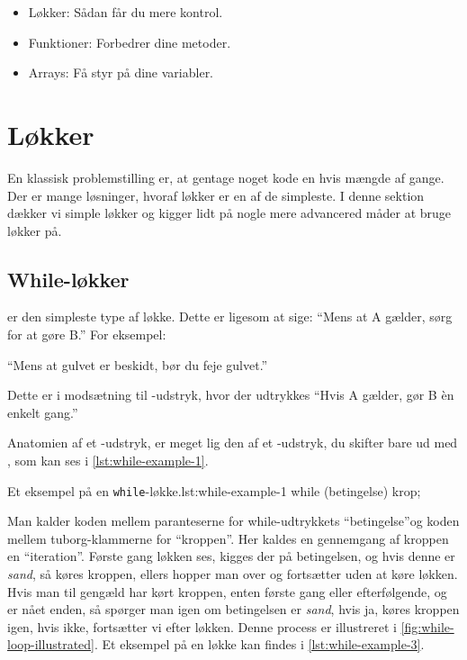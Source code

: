 	\begin{itemize} %
		\item Løkker: Sådan får du mere kontrol.
		\item Funktioner: Forbedrer dine metoder.
		\item Arrays: Få styr på dine variabler.
	\end{itemize}

\section{Løkker}

    En klassisk problemstilling er, at gentage noget kode en hvis
    mængde af gange. Der er mange løsninger, hvoraf løkker er en af
    de simpleste. I denne sektion dækker vi simple løkker og kigger
    lidt på nogle mere advancered måder at bruge løkker på.

	\subsection{While-løkker}

         er den simpleste type af løkke. Dette er ligesom at
		sige: ``Mens at A gælder, sørg for at gøre B.'' For eksempel:

		``Mens at gulvet er beskidt, bør du feje gulvet.''

		Dette er i modsætning til -udstryk, hvor der udtrykkes
		``Hvis A gælder, gør B èn enkelt gang.''

		Anatomien af et -udstryk, er meget lig den af et
		-udstryk, du skifter bare  ud med
		, som kan ses i \autoref{lst:while-example-1}.

		\begin{JavaCode}{Et eksempel på en \texttt{while}-løkke.}{lst:while-example-1}
			while (betingelse) {
				krop;
			}
		\end{JavaCode}

        Man kalder koden mellem paranteserne for while-udtrykkets
        ``betingelse''og koden mellem tuborg-klammerne for ``kroppen''.
        Her kaldes en gennemgang af kroppen en ``iteration''.  Første gang
        løkken ses, kigges der på betingelsen, og hvis denne er
        \emph{sand}, så køres kroppen, ellers hopper man over og
        fortsætter uden at køre løkken. Hvis man til gengæld har kørt
        kroppen, enten første gang eller efterfølgende, og er nået
        enden, så spørger man igen om betingelsen er \emph{sand}, hvis
        ja, køres kroppen igen, hvis ikke, fortsætter vi efter løkken.
        Denne process er illustreret i
        \autoref{fig:while-loop-illustrated}. Et eksempel på en
        løkke kan findes i \autoref{lst:while-example-3}.

